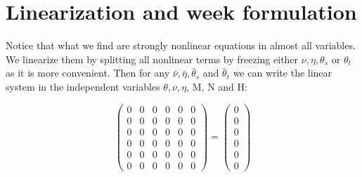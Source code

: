 
\usepackage{pdfsync}
\usepackage{amsmath}
\usepackage{graphicx}

\section{Linearization and week formulation}

Notice that what we find are strongly nonlinear equations in almost all variables.
We linearize them by splitting all nonlinear terms by freezing either $\nu, \eta, \theta_s$ or $\theta_t$ as it is more convenient. Then for any $\bar{\nu}, \bar{\eta}, \bar{\theta}_s$ and $\bar{\theta}_t$ we can write the linear system in the independent variables $\theta, \nu, \eta$, M, N and H:

\[\begin{pmatrix}
0 & 0 & 0 & 0 & 0 & 0 \\
0 & 0 & 0 & 0 & 0 & 0 \\
0 & 0 & 0 & 0 & 0 & 0 \\
0 & 0 & 0 & 0 & 0 & 0 \\
0 & 0 & 0 & 0 & 0 & 0 \\
0 & 0 & 0 & 0 & 0 & 0 
\end{pmatrix}
=
\begin{pmatrix}
0\\
0\\
0\\
0\\
0\\
0
\end{pmatrix}\]


